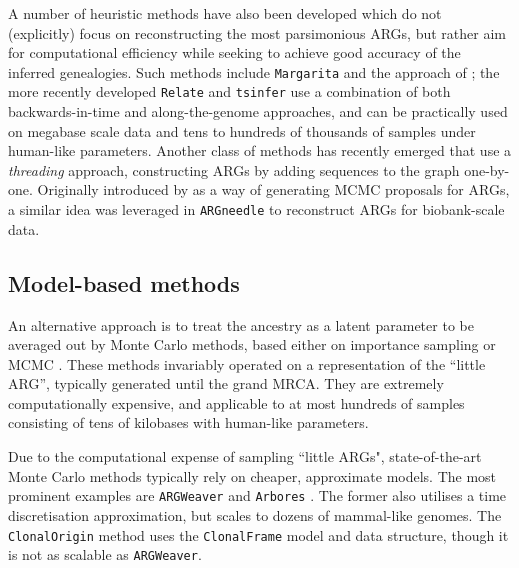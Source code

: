 \documentclass{article}
\begin{document}
A number of heuristic methods have also been developed which do not (explicitly) focus on reconstructing
the most parsimonious ARGs, but rather aim for computational efficiency while seeking to achieve good
accuracy of the inferred genealogies. Such methods include \texttt{Margarita} \citep{minichiello2006mapping}
and the approach of \citet{parida2008estimating}; the more recently developed \texttt{Relate}
\citep{speidel2019method} and \texttt{tsinfer} \citep{kelleher2019inferring} use a combination of both
backwards-in-time and along-the-genome approaches, and can be practically used on megabase scale data
and tens to hundreds of thousands of samples under human-like parameters.
Another class of methods has recently emerged that use a \emph{threading} approach, constructing ARGs
by adding sequences to the graph one-by-one. Originally introduced by \citet{rasmussen2014genome} as a
way of generating MCMC proposals for ARGs, a similar idea was leveraged in \texttt{ARGneedle}
\citep{zhang2021biobank} to reconstruct ARGs for biobank-scale data.

\subsection*{Model-based methods}
An alternative approach is to treat the ancestry as a latent parameter to be averaged out
by Monte Carlo methods, based either on importance sampling
\citep{griffiths1996ancestral, fearnhead2001estimating, jenkins2011inference}
or MCMC \citep{kuhner2000maximum, nielsen2000estimation, wang2008bayesian, fallon2013acg}.
These methods invariably operated on a representation of the ``little ARG'', typically
generated until the grand MRCA. They are extremely computationally expensive,
and applicable to at most hundreds of samples consisting of tens of kilobases with
human-like parameters.

Due to the computational expense of sampling ``little ARGs", state-of-the-art
Monte Carlo methods typically rely on cheaper, approximate models.
The most prominent examples are \texttt{ARGWeaver} \citep{rasmussen2014genome}
and \texttt{Arbores} \citep{heine2018bridging}. The former also utilises a time
discretisation approximation, but scales to dozens of mammal-like genomes.
The \texttt{ClonalOrigin} method \citep{didelot2010inference,
medina2020speeding} uses the \texttt{ClonalFrame}
model and data structure, though it is not as scalable as \texttt{ARGWeaver}.
\end{document}
